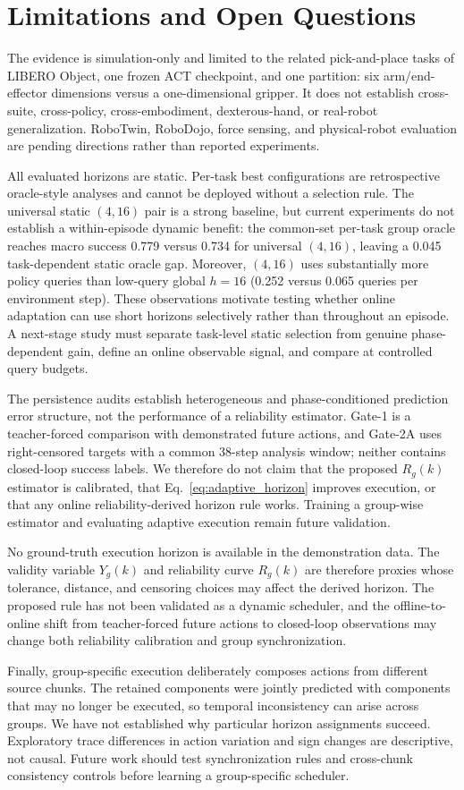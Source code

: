 \section{Limitations and Open Questions}
\label{sec:limitations}

The evidence is simulation-only and limited to the related pick-and-place tasks
of LIBERO Object, one frozen ACT checkpoint, and one partition: six
arm/end-effector dimensions versus a one-dimensional gripper.  It does not
establish cross-suite, cross-policy, cross-embodiment, dexterous-hand, or
real-robot generalization.  RoboTwin, RoboDojo, force sensing, and physical-robot
evaluation are pending directions rather than reported experiments.

All evaluated horizons are static.  Per-task best configurations are
retrospective oracle-style analyses and cannot be deployed without a selection
rule.  The universal static $(4,16)$ pair is a strong baseline, but current
experiments do not establish a within-episode dynamic benefit: the common-set
per-task group oracle reaches macro success 0.779 versus 0.734 for universal
$(4,16)$, leaving a 0.045 task-dependent static oracle gap.  Moreover, $(4,16)$
uses substantially more policy queries than low-query global $h=16$ (0.252
versus 0.065 queries per environment step).  These observations motivate
testing whether online adaptation can use short horizons selectively rather than
throughout an episode.  A next-stage study must separate task-level static
selection from genuine phase-dependent gain, define an online observable signal,
and compare at controlled query budgets.

The persistence audits establish heterogeneous and phase-conditioned prediction
error structure, not the performance of a reliability estimator.  Gate-1 is a
teacher-forced comparison with demonstrated future actions, and Gate-2A uses
right-censored targets with a common 38-step analysis window; neither contains
closed-loop success labels.  We therefore do not claim that the proposed
$R_g(k)$ estimator is calibrated, that Eq.~\ref{eq:adaptive_horizon} improves
execution, or that any online reliability-derived horizon rule works.  Training
a group-wise estimator and evaluating adaptive execution remain future
validation.

No ground-truth execution horizon is available in the demonstration data.  The
validity variable $Y_g(k)$ and reliability curve $R_g(k)$ are therefore proxies
whose tolerance, distance, and censoring choices may affect the derived horizon.
The proposed rule has not been validated as a dynamic scheduler, and the
offline-to-online shift from teacher-forced future actions to closed-loop
observations may change both reliability calibration and group synchronization.

Finally, group-specific execution deliberately composes actions from different
source chunks.  The retained components were jointly predicted with components
that may no longer be executed, so temporal inconsistency can arise across
groups.  We have not established why particular horizon assignments succeed.
Exploratory trace differences in action variation and sign changes are
descriptive, not causal.  Future work should test synchronization rules and
cross-chunk consistency controls before learning a group-specific scheduler.

